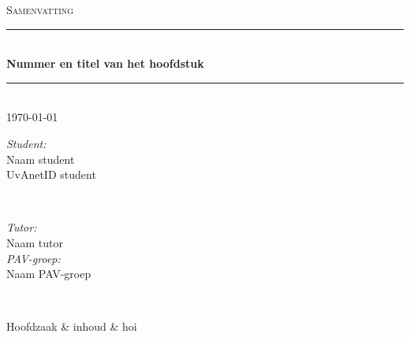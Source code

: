 \documentclass[a4paper,12pt]{article}
\newcommand{\opdracht}{Samenvatting}			%
\newcommand{\titel}{Nummer en titel van het hoofdstuk}	%
\newcommand{\studentA}{Naam student}			%
\newcommand{\uvanetidA}{UvAnetID student}
\newcommand{\tutor}{Naam tutor}				%
\newcommand{\PAVgroep}{Naam  PAV-groep}		%
\newcommand{\datum}{\today}					%
\begin{document}
\thispagestyle{firststyle}
\begin{center}
	\textsc{\Large \opdracht}\\[0.2cm]
		\rule{\linewidth}{0.5pt} \\[0.4cm]
			{ \huge \bfseries \titel}
		\rule{\linewidth}{0.5pt} \\[0.2cm]
	{\large \datum  \\[0.4cm]}

	\begin{minipage}{0.4\textwidth}
		\begin{flushleft}
			\emph{Student:}\\
			{\studentA \\ {\small \uvanetidA \\[0.2cm]}}
		\end{flushleft}
	\end{minipage}
~
	\begin{minipage}{0.4\textwidth}
		\begin{flushright}
			\emph{Tutor:} \\
			\tutor \\[0.2cm]
			\emph{PAV-groep:} \\
			\PAVgroep \\[0.2cm]
		\end{flushright}
	\end{minipage}\\[1 cm]
\end{center}


Hoofdzaak
& inhoud
& hoi

\end{document}
